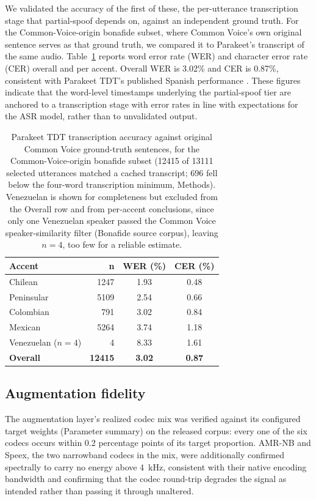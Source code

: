 \documentclass[11pt]{article}
\begin{document}
We validated the accuracy of the first of these, the per-utterance
transcription stage that partial-spoof depends on, against an
independent ground truth. For the Common-Voice-origin bonafide subset,
where Common Voice's own original sentence serves as that ground truth,
we compared it to Parakeet's transcript of the same audio.
Table~\ref{tab:parakeetwer} reports word error rate (WER) and character
error rate (CER) overall and per accent. Overall WER is 3.02\% and CER
is 0.87\%, consistent with Parakeet TDT's published Spanish performance
\citep{parakeet}. These figures indicate that the word-level timestamps
underlying the partial-spoof tier are anchored to a transcription stage
with error rates in line with expectations for the ASR model, rather
than to unvalidated output.

\begin{table}[t]
\centering
\caption{Parakeet TDT transcription accuracy against original Common
Voice ground-truth sentences, for the Common-Voice-origin bonafide
subset (12415 of 13111 selected utterances matched a cached
transcript; 696 fell below the four-word transcription minimum,
Methods). Venezuelan is shown for completeness but excluded from the
Overall row and from per-accent conclusions, since only one Venezuelan
speaker passed the Common Voice speaker-similarity filter (Bonafide
source corpus), leaving $n=4$, too few for a reliable estimate.}
\label{tab:parakeetwer}
\small
\begin{tabular}{lrcc}
\toprule
\textbf{Accent} & \textbf{n} & \textbf{WER (\%)} & \textbf{CER (\%)} \\
\midrule
Chilean       &  1247 & 1.93 & 0.48 \\
Peninsular    &  5109 & 2.54 & 0.66 \\
Colombian     &    791 & 3.02 & 0.84 \\
Mexican       &  5264 & 3.74 & 1.18 \\
Venezuelan ($n{=}4$) &   4 & 8.33 & 1.61 \\
\midrule
\textbf{Overall} & \textbf{12415} & \textbf{3.02} & \textbf{0.87} \\
\bottomrule
\end{tabular}
\end{table}

\subsection*{Augmentation fidelity}

The augmentation layer's realized codec mix was verified against its
configured target weights (Parameter summary) on the released corpus:
every one of the six codecs occurs within 0.2 percentage points of its
target proportion. AMR-NB and Speex, the two narrowband codecs in the
mix, were additionally confirmed spectrally to carry no energy above
\SI{4}{\kilo\hertz}, consistent with their native encoding bandwidth and
confirming that the codec round-trip degrades the signal as intended
rather than passing it through unaltered.
\end{document}
